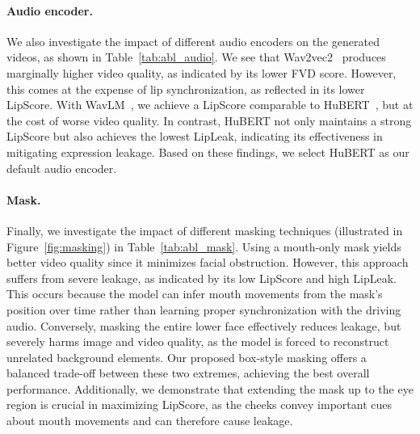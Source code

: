 \paragraph{Audio encoder.}




We also investigate the impact of different audio encoders on the generated videos, as shown in Table~\ref{tab:abl_audio}. We see that Wav2vec2~\cite{wav2vec2} produces marginally higher video quality, as indicated by its lower FVD score. However, this comes at the expense of lip synchronization, as reflected in its lower LipScore. With WavLM~\cite{wavlm}, we achieve a LipScore comparable to HuBERT~\cite{hubert}, but at the cost of worse video quality. In contrast, HuBERT not only maintains a strong LipScore but also achieves the lowest LipLeak, indicating its effectiveness in mitigating expression leakage. Based on these findings, we select HuBERT as our default audio encoder.

\paragraph{Mask.}


Finally, we investigate the impact of different masking techniques (illustrated in Figure~\ref{fig:masking}) in Table~\ref{tab:abl_mask}. Using a mouth-only mask yields better video quality since it minimizes facial obstruction. However, this approach suffers from severe leakage, as indicated by its low LipScore and high LipLeak. This occurs because the model can infer mouth movements from the mask’s position over time rather than learning proper synchronization with the driving audio. Conversely, masking the entire lower face effectively reduces leakage, but severely harms image and video quality, as the model is forced to reconstruct unrelated background elements. Our proposed box-style masking offers a balanced trade-off between these two extremes, achieving the best overall performance. Additionally, we demonstrate that extending the mask up to the eye region is crucial in maximizing LipScore, as the cheeks convey important cues about mouth movements and can therefore cause leakage. 
